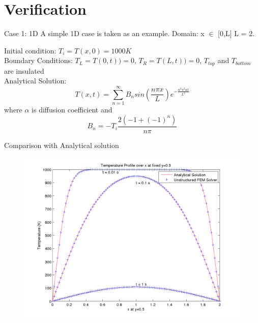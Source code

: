 \documentclass[t,english]{beamer}
\begin{document}
\section{Verification}
\begin{frame}[c]{Case 1: 1D}
A simple 1D case is taken as an example.
Domain: x $\in$ [0,L] L = 2.

Initial condition: $T_i = T(x,0) = 1000 K$
\\
Boundary Conditions: $T_L = T(0,t)) = 0$, 
$T_R = T(L,t)) = 0$, $T_{top}$ and $T_{bottom}$ are insulated
\\
Analytical Solution: $$T(x,t) = \sum_{n=1}^{\infty} B_n sin(\frac{n \pi x}{L}) e^{-\frac{n^2 \pi^2 \alpha t}{L^2}} $$ where $\alpha$ is diffusion coefficient and  $$B_n = -T_i \frac{2(-1 + (-1)^n)}{n\pi}$$

\end{frame}

\begin{frame}[c]{Comparison with Analytical solution}
\begin{figure}[ht!]
\centering
\includegraphics[scale=0.4]{1D.png}
\end{figure}
\end{frame}
\end{document}
